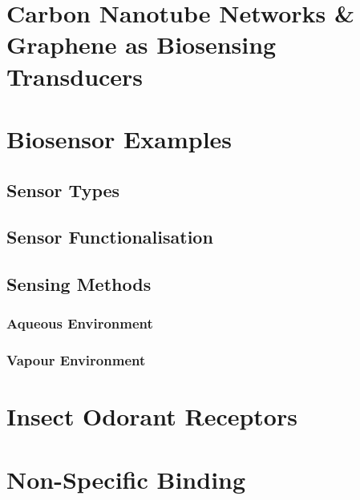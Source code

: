 \documentclass[
  a4paper,
]{scrbook}
\begin{document}
\hypertarget{sec-biosensing-transducers}{%
\section{Carbon Nanotube Networks \& Graphene as Biosensing
Transducers}\label{sec-biosensing-transducers}}

\hypertarget{biosensor-examples}{%
\section{Biosensor Examples}\label{biosensor-examples}}

\hypertarget{sensor-types}{%
\subsection{Sensor Types}\label{sensor-types}}

\hypertarget{sensor-functionalisation}{%
\subsection{Sensor Functionalisation}\label{sensor-functionalisation}}

\hypertarget{sec-biosensor-methods}{%
\subsection{Sensing Methods}\label{sec-biosensor-methods}}

\hypertarget{aqueous-environment}{%
\subsubsection*{Aqueous Environment}\label{aqueous-environment}}

\hypertarget{vapour-environment}{%
\subsubsection*{Vapour Environment}\label{vapour-environment}}

\hypertarget{insect-odorant-receptors}{%
\section{Insect Odorant Receptors}\label{insect-odorant-receptors}}

\hypertarget{non-specific-binding}{%
\section{Non-Specific Binding}\label{non-specific-binding}}
\end{document}
